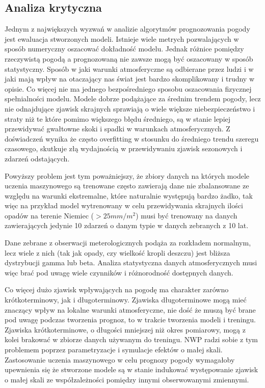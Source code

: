 \subsection{Analiza krytyczna}

Jednym z największych wyzwań w analizie algorytmów prognozowania pogody jest ewaluacja 
stworzonych modeli. Istnieje wiele metrych pozwalających w sposób numeryczny oszacować
dokładność modelu. Jednak różnice pomiędzy rzeczywistą pogodą a prognozowaną nie zawsze
mogą być oszacowany w sposób statystyczny. Sposób w jaki warunki atmosferyczne są odbierane
przez ludzi i w jaki mają wpływ na otaczający nas świat jest bardzo skomplikowany i trudny
w opisie. Co więcej nie ma jednego bezpośredniego sposobu oszacowania fizycznej spełnialności
modelu\cite{deep-learning-for-improving-numerical}.
Modele dobrze podążające za średnim trendem pogody, lecz nie odnajdujące
zjawisk skrajnych sprawiają o wiele większe niebezpieczeństwo i straty niż te które
pomimo większego błędu średniego, są w stanie lepiej przewidywać gwałtowne skoki i spadki
w warunkach atmosferycznych. Z doświadczeń wynika że często overfitting w stosunku do
średniego trendu szeregu czasowego, skutkuje złą wydajnością w przewidywaniu
zjawisk sezonowych i zdarzeń odstających.

Powyższy problem jest tym poważniejszy, że zbiory danych na których modele uczenia maszynowego
są trenowane często zawierają dane nie zbalansowane ze względu na warunki ekstremalne, które naturalnie
występują bardzo żadko, tak więc na przykład model wytrenowany w celu przewidywania
skrajnych ilości opadów na terenie Niemiec ($> 25mm/m^2$) musi być trenowany na danych 
zawierających jedynie 10 zdarzeń o danym typie w danych zebranych z 10 lat\cite{can-dl-beat-numerical}.

Dane zebrane z obserwacji meterologicznych podąża za
rozkładem normalnym, lecz wiele z nich (tak jak opady, czy wielkość kropli deszczu) 
\cite{can-dl-beat-numerical} jest bliższa dystrybucji gamma lub beta. Analiza statystyczna
danych atmosferycznych musi więc brać pod uwagę wiele czynników i różnorodność dostępnych danych.

Co więcej dużo zjawisk wpływających na pogodę ma charakter zarówno krótkoterminowy, jak i 
długoterminowy. Zjawiska długoterminowe mogą mieć znaczący wpływ na lokalne warunki atmosferyczne,
nie dość że muszą być brane pod uwagę podczas tworzenia prognoz, to w trakcie tworzenia modeli
i treningu. Zjawiska krótkoterminowe, o długości mniejszej niż okres pomiarowy, mogą z kolei
brakować w zbiorze danych używanym do treningu. NWP radzi sobie z tym problemem poprzez 
parametryzacje i symulacje efektów o małej skali. Zastosowanie uczenia maszynowego
w celu prognozy pogody wymagałoby upewnienia się że stworzone modele są w stanie 
indukować występowanie zjawisk o małej skali ze współzależności pomiędzy innymi obserwowanymi 
zmiennymi.

